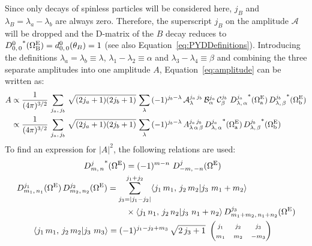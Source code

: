 Since only decays of spinless particles will be considered here, $j_B$ and
$\lambda_B=\lambda_a-\lambda_b$ are always zero. Therefore, the superscript $j_B$ on the amplitude
$\mathcal{A}$ will be dropped and the D-matrix of the $B$ decay reduces to
${D_{0,\,0}^{0}}^*(\EulSet[B]) = d_{0,\,0}^{0}(\theta_B) = 1$ (see also
Equation~\ref{eq:PYDDefinitions}). Introducing the definitions $\lambda_a=\lambda_b\equiv\lambda$,
$\lambda_1-\lambda_2\equiv\alpha$ and $\lambda_3-\lambda_4\equiv\beta$ and combining the three
separate amplitudes into one amplitude $A$, Equation~\ref{eq:amplitude} can be written as:
\begin{align}\label{eq:amplitude1}
  A &\propto \frac{1}{(4\pi)^{3/2}}\,
       \sum_{j_a,\,j_b}\,
       \sqrt{(2j_a+1)(2j_b+1)}\,
       \sum_\lambda\,
       (-1)^{j_b-\lambda}\,
       \mathcal{A}_\lambda^{j_a\,j_b}\, \mathcal{B}_\alpha^{j_a}\, \mathcal{C}_\beta^{j_b}\
       {D_{\lambda,\,\alpha}^{j_a}}^*(\EulSet[a])\,
       {D_{\lambda,\,\beta}^{j_b}}^*(\EulSet[b])
       \nonumber\\
    &\propto \frac{1}{(4\pi)^{3/2}}\,
       \sum_{j_a,\,j_b}\,
        \sqrt{(2j_a+1)(2j_b+1)}\,
       \sum_\lambda\,
       (-1)^{j_b-\lambda}\,
       A_{\lambda\,\alpha\,\beta}^{j_a\,j_b}\,
       {D_{\lambda,\,\alpha}^{j_a}}^*(\EulSet[a])\,
       {D_{\lambda,\,\beta}^{j_b}}^*(\EulSet[b])
\end{align}
%
To find an expression for $|A|^2$, the following relations are used:
%
\begin{subequations}\begin{align}
  &\qquad\qquad\qquad\qquad
    {D_{m,\,n}^{j}}^*(\EulSet) = (-1)^{m-n}\ D_{-m,\,-n}^{j}(\EulSet) \\
  &D_{m_1,\,n_1}^{j_1}(\EulSet)\,D_{m_2,\,n_2}^{j_2}(\EulSet)
    = \sum_{j_3=|j_1-j_2|}^{j_1+j_2}
    \langle j_1\,m_1,\,j_2\,m_2|j_3\ m_1+m_2 \rangle
    \nonumber\\&\qquad\qquad\qquad\qquad\qquad\qquad\quad\times
    \langle j_1\,n_1,\,j_2\,n_2|j_3\ n_1+n_2 \rangle\,
    D_{m_1+m_2,\,n_1+n_2}^{j_3}(\EulSet) \\
  &\qquad
    \langle j_1\,m_1,\,j_2\,m_2|j_3\ m_3 \rangle
    = (-1)^{j_1-j_2+m_3}\,\sqrt{2\,j_3+1}\
    \begin{pmatrix}
      \mss{j_1} & \mss{j_2} & \mss{j_3} \\
      \mss{m_1} & \mss{m_2} & \mss{-m_3}
    \end{pmatrix}
\end{align}\end{subequations}
